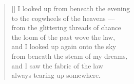 \documentclass[a4paper,12pt,twoside,final]{book}
\begin{document}

\settowidth{\versewidth}{from under the steam of my dreams,}

\begin{verse}[\versewidth]
  I looked up from beneath the evening \\
  to the cogwheels of the heavens --- \\
  from the glittering threads of chance \\
  the loom of the past wove the law, \\
  and I looked up again onto the sky \\
  from beneath the steam of my dreams, \\
  and I saw the fabric of the law \\
  always tearing up somewhere.
\end{verse}


\newpage

\settowidth{\versewidth}{törvényt szőtt a mult szövőszéke}
\end{document}

